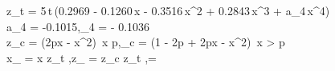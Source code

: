 z_t = 5\,t\,\left(0.2969 - 0.1260\,x - 0.3516\,x^2 + 0.2843\,x^3 + a_4\,x^4\right) \\

a_4 = -0.1015\quad {},\qquada_4 =  - 0.1036\quad {} \\

z_c = \left(2px - x^2\right)\quad {}\ x \leq p,\qquadz_c = \left(1 - 2p + 2px - x^2\right)\quad {}\ x > p \\

x_ = x \mp z_t \sin\theta,\qquad z_ = z_c \pm z_t \cos\theta,\qquad\theta = \arctan{}
